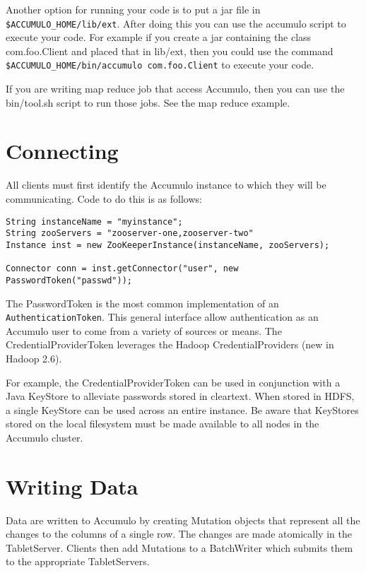 Another option for running your code is to put a jar file in
\texttt{\$ACCUMULO\_HOME/lib/ext}. After doing this you can use the accumulo
script to execute your code. For example if you create a jar containing the
class com.foo.Client and placed that in lib/ext, then you could use the command
\texttt{\$ACCUMULO\_HOME/bin/accumulo com.foo.Client} to execute your code.

If you are writing map reduce job that access Accumulo, then you can use the
bin/tool.sh script to run those jobs. See the map reduce example.

\section{Connecting}

All clients must first identify the Accumulo instance to which they will be
communicating. Code to do this is as follows:

\begingroup\fontsize{8pt}{8pt}\selectfont\begin{verbatim}
String instanceName = "myinstance";
String zooServers = "zooserver-one,zooserver-two"
Instance inst = new ZooKeeperInstance(instanceName, zooServers);

Connector conn = inst.getConnector("user", new PasswordToken("passwd"));
\end{verbatim}\endgroup

The PasswordToken is the most common implementation of an \texttt{AuthenticationToken}.
This general interface allow authentication as an Accumulo user to come from
a variety of sources or means. The CredentialProviderToken leverages the Hadoop
CredentialProviders (new in Hadoop 2.6).

For example, the CredentialProviderToken can be used in conjunction with a Java
KeyStore to alleviate passwords stored in cleartext. When stored in HDFS, a single
KeyStore can be used across an entire instance. Be aware that KeyStores stored on
the local filesystem must be made available to all nodes in the Accumulo cluster.

\section{Writing Data}

Data are written to Accumulo by creating Mutation objects that represent all the
changes to the columns of a single row. The changes are made atomically in the
TabletServer. Clients then add Mutations to a BatchWriter which submits them to
the appropriate TabletServers.


